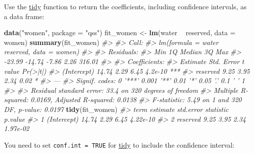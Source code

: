 \documentclass[]{book}
\newenvironment{Shaded}{\begin{snugshade}}{\end{snugshade}}
\newcommand{\CommentTok}[1]{\textcolor[rgb]{0.56,0.35,0.01}{\textit{#1}}}
\newcommand{\DataTypeTok}[1]{\textcolor[rgb]{0.13,0.29,0.53}{#1}}
\newcommand{\KeywordTok}[1]{\textcolor[rgb]{0.13,0.29,0.53}{\textbf{#1}}}
\newcommand{\NormalTok}[1]{#1}
\newcommand{\OperatorTok}[1]{\textcolor[rgb]{0.81,0.36,0.00}{\textbf{#1}}}
\newcommand{\StringTok}[1]{\textcolor[rgb]{0.31,0.60,0.02}{#1}}
\theoremstyle{definition}
\theoremstyle{definition}
\theoremstyle{definition}
\theoremstyle{remark}
\begin{document}
Use the
\href{https://www.rdocumentation.org/packages/broom/topics/tidy}{tidy}
function to return the coefficients, including confidence intervals, as
a data frame:

\begin{Shaded}
\begin{Highlighting}[]
\KeywordTok{data}\NormalTok{(}\StringTok{"women"}\NormalTok{, }\DataTypeTok{package =} \StringTok{"qss"}\NormalTok{)}
\NormalTok{fit_women <-}\StringTok{ }\KeywordTok{lm}\NormalTok{(water }\OperatorTok{~}\StringTok{ }\NormalTok{reserved, }\DataTypeTok{data =}\NormalTok{ women)}
\KeywordTok{summary}\NormalTok{(fit_women)}
\CommentTok{#> }
\CommentTok{#> Call:}
\CommentTok{#> lm(formula = water ~ reserved, data = women)}
\CommentTok{#> }
\CommentTok{#> Residuals:}
\CommentTok{#>    Min     1Q Median     3Q    Max }
\CommentTok{#> -23.99 -14.74  -7.86   2.26 316.01 }
\CommentTok{#> }
\CommentTok{#> Coefficients:}
\CommentTok{#>             Estimate Std. Error t value Pr(>|t|)    }
\CommentTok{#> (Intercept)    14.74       2.29    6.45  4.2e-10 ***}
\CommentTok{#> reserved        9.25       3.95    2.34     0.02 *  }
\CommentTok{#> ---}
\CommentTok{#> Signif. codes:  0 '***' 0.001 '**' 0.01 '*' 0.05 '.' 0.1 ' ' 1}
\CommentTok{#> }
\CommentTok{#> Residual standard error: 33.4 on 320 degrees of freedom}
\CommentTok{#> Multiple R-squared:  0.0169, Adjusted R-squared:  0.0138 }
\CommentTok{#> F-statistic: 5.49 on 1 and 320 DF,  p-value: 0.0197}
\KeywordTok{tidy}\NormalTok{(fit_women)}
\CommentTok{#>          term estimate std.error statistic  p.value}
\CommentTok{#> 1 (Intercept)    14.74      2.29      6.45 4.22e-10}
\CommentTok{#> 2    reserved     9.25      3.95      2.34 1.97e-02}
\end{Highlighting}
\end{Shaded}

You need to set \texttt{conf.int\ =\ TRUE} for
\href{https://www.rdocumentation.org/packages/broom/topics/tidy.lm}{tidy}
to include the confidence interval:
\end{document}
